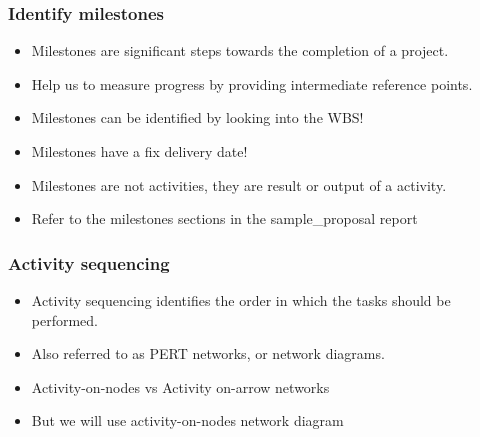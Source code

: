 


\begin{frame}[t]\frametitle{Identify milestones}
    \begin{itemize}
    	\item Milestones are significant steps towards the completion of a project.
    	\item Help us to measure progress by providing intermediate reference points.
    	\item Milestones can be identified by looking into the WBS!
        \item Milestones have a fix delivery date!
        \item Milestones are not activities, they are result or output of a activity.
        \item Refer to the milestones sections in the sample\_proposal report
    \end{itemize}
\end{frame}

\begin{frame}[t]\frametitle{Activity sequencing}
\begin{itemize}
    	\item Activity sequencing identifies the order in which the tasks should be performed.
    	\item Also referred to as PERT networks, or network diagrams.
    	\item Activity-on-nodes vs Activity on-arrow networks
    	\item But we will use activity-on-nodes network diagram
    \end{itemize}
\end{frame}


